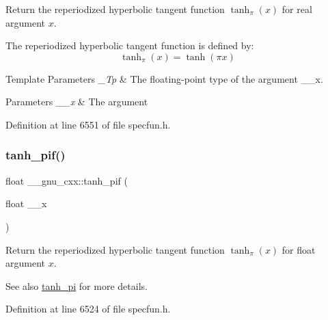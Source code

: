 Return the reperiodized hyperbolic tangent function $ \tanh_\pi(x) $ for real argument $ x $.

The reperiodized hyperbolic tangent function is defined by\+: \[ \tanh_\pi(x) = \tanh(\pi x) \]


\begin{DoxyTemplParams}{Template Parameters}
{\em \+\_\+\+Tp} & The floating-\/point type of the argument {\ttfamily \+\_\+\+\_\+x}. \\
\hline
\end{DoxyTemplParams}

\begin{DoxyParams}{Parameters}
{\em \+\_\+\+\_\+x} & The argument \\
\hline
\end{DoxyParams}


Definition at line 6551 of file specfun.\+h.

\mbox{\label{group__gnu__math__spec__func_gab6cbfb582127f997ad9a198903d08889}} 
\subsubsection{\texorpdfstring{tanh\+\_\+pif()}{tanh\_pif()}}
{\footnotesize\ttfamily float \+\_\+\+\_\+gnu\+\_\+cxx\+::tanh\+\_\+pif (\begin{DoxyParamCaption}\item[{float}]{\+\_\+\+\_\+x }\end{DoxyParamCaption})\hspace{0.3cm}{\ttfamily [inline]}}

Return the reperiodized hyperbolic tangent function $ \tanh_\pi(x) $ for {\ttfamily float} argument $ x $.

\begin{DoxySeeAlso}{See also}
\hyperlink{group__gnu__math__spec__func_ga8729ffd5acf3266315e9dac1b5a9b3a6}{tanh\+\_\+pi} for more details. 
\end{DoxySeeAlso}


Definition at line 6524 of file specfun.\+h.

\mbox{\label{group__gnu__math__spec__func_ga4bc71ee5cf3df2ba35e6504027e5c6c6}} 
